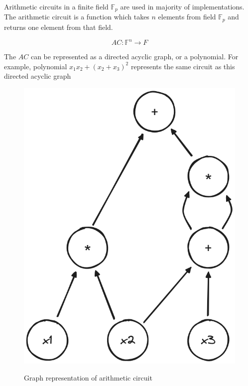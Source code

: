\documentclass[conference,comsoc,10pt]{IEEEtran}
\begin{document}
        Arithmetic circuits in a finite field $\mathbb{F}_p$ are used in majority
        of implementations. The arithmetic circuit is a function which takes
        $n$ elements from field $\mathbb{F}_p$ and returns one element from that field.

        \[AC: \mathbb{F}^n \rightarrow F \]

        The $AC$ can be represented as a directed acyclic graph, or a polynomial. For
        example, polynomial $x_1x_2 + (x_2 + x_3)^2$ represents the same circuit as this
        directed acyclic graph

        \begin{figure}[h]
            \centering
            \includegraphics[scale=0.15]{../bachelor/assets/images/dag_example.png}
            \caption{Graph representation of arithmetic circuit}
            \label{fig:dag_example}
            \cite{youtuMOOCLecture3}
            \vspace{0.5cm}
        \end{figure}
\end{document}
